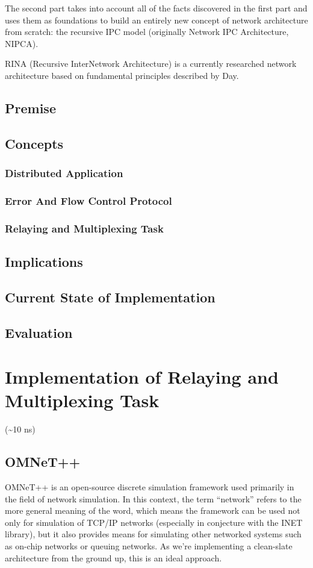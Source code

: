     The second part takes into account all of the facts discovered in the first part and uses them as foundations to build an entirely new concept of network architecture from scratch: the recursive IPC model (originally Network IPC Architecture, NIPCA).

    RINA (Recursive InterNetwork Architecture) is a currently researched network architecture based on fundamental principles described by Day.

    \section{Premise}

    \section{Concepts}
        \subsection{Distributed Application}
        \subsection{Error And Flow Control Protocol}
        \subsection{Relaying and Multiplexing Task}
    \section{Implications}
    \section{Current State of Implementation}
    \section{Evaluation}

\chapter{Implementation of Relaying and Multiplexing Task}
    (\textasciitilde10 ns)
    \section{OMNeT++}
        OMNeT++ is an open-source discrete simulation framework used primarily in the field of network simulation. In this context, the term ``network'' refers to the more general meaning of the word, which means the framework can be used not only for simulation of TCP/IP networks (especially in conjecture with the INET library), but it also provides means for simulating other networked systems such as on-chip networks or queuing networks. As we're implementing a clean-slate architecture from the ground up, this is an ideal approach.

